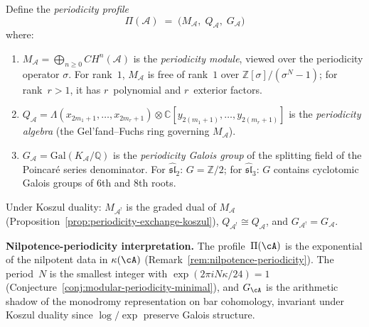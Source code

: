 \begin{remark}\label{rem:periodicity-triple}
Define the \emph{periodicity profile}
\[
\Pi(\mathcal{A}) \;=\; \bigl(M_{\mathcal{A}},\; Q_{\mathcal{A}},\;
G_{\mathcal{A}}\bigr)
\]
where:
\begin{enumerate}[label=\textup{(\roman*)}]
\item $M_{\mathcal{A}} = \bigoplus_{n \geq 0} CH^n(\mathcal{A})$ is the \emph{periodicity module}, viewed over the periodicity operator $\sigma$.  For rank~$1$, $M_{\mathcal{A}}$ is free of rank~$1$ over $\mathbb{Z}[\sigma]/(\sigma^N - 1)$; for rank~$r > 1$, it has $r$~polynomial and $r$~exterior factors.
\item $Q_{\mathcal{A}} = \Lambda(x_{2m_1+1}, \ldots, x_{2m_r+1}) \otimes \mathbb{C}[y_{2(m_1+1)}, \ldots, y_{2(m_r+1)}]$ is the \emph{periodicity algebra} (the Gel'fand--Fuchs ring governing $M_{\mathcal{A}}$).
\item $G_{\mathcal{A}} = \mathrm{Gal}(K_{\mathcal{A}}/\mathbb{Q})$ is the \emph{periodicity Galois group} of the splitting field of the Poincar\'e series denominator.  For $\widehat{\mathfrak{sl}}_2$: $G = \mathbb{Z}/2$; for $\widehat{\mathfrak{sl}}_3$: $G$ contains cyclotomic Galois groups of $6$th and $8$th roots.
\end{enumerate}
Under Koszul duality: $M_{\mathcal{A}^!}$ is the graded dual of $M_{\mathcal{A}}$ (Proposition~\ref{prop:periodicity-exchange-koszul}), $Q_{\mathcal{A}^!} \cong Q_{\mathcal{A}}$, and $G_{\mathcal{A}^!} = G_{\mathcal{A}}$.

\textbf{Nilpotence-periodicity interpretation.}
The profile~$\Pi(\cA)$ is the exponential of the nilpotent data in $\kappa(\cA)$ (Remark~\ref{rem:nilpotence-periodicity}).  The period~$N$ is the smallest integer with $\exp(2\pi i N \kappa/24) = 1$ (Conjecture~\ref{conj:modular-periodicity-minimal}), and $G_{\cA}$ is the arithmetic shadow of the monodromy representation on bar cohomology, invariant under Koszul duality since $\log/\exp$ preserve Galois structure.
\end{remark}

